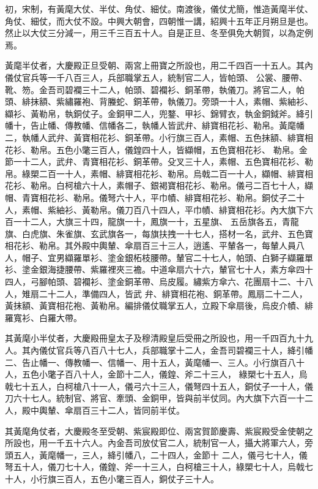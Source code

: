 \begin{pinyinscope}
 初，宋制，有黃麾大仗、半仗、角仗、細仗。南渡後，儀仗尤簡，惟造黃麾半仗、角仗、細仗，而大仗不設。中興大朝會，四朝惟一講，紹興十五年正月朔旦是也。然止以大仗三分減一，用三千三百五十人。自是正旦、冬至俱免大朝賀，以為定例焉。



 黃麾半仗者，大慶殿正旦受朝、兩宮上冊寶之所設也，用二千四百一十五人。其內儀仗官兵等一千八百三人，兵部職掌五人，統制官二人，皆帕頭、
 公裳、腰帶、靴、笏。金吾司碧襴三十二人，帕頭、碧襴衫、銅革帶，執儀刀。將官二人，帕頭、緋抹額、紫繡羅袍、背螣蛇、銅革帶，執儀刀。旁頭一十人，素帽、紫紬衫、纈衫、黃勒帛，執銅仗子。金銅甲二人，兜鍪、甲衫、錦臂衣，執金銅鉞斧。絳引幡十，告止幡、傳教幡、信幡各二，執幡人皆武弁、緋寶相花衫、勒帛。黃麾幡二，執幡人武弁、黃寶相花衫、銅革帶。小行旗三百人，素帽、五色抹額、緋寶相花衫、勒帛。五色小氅三百人，儀鍠四十人，皆纈帽，五色寶相花衫、
 勒帛。金節一十二人，武弁、青寶相花衫、銅革帶。殳叉三十人，素帽、五色寶相花衫、勒帛。綠槊二百一十人，素帽、緋寶相花衫、勒帛。烏戟二百一十人，纈帽、緋寶相花衫、勒帛。白柯槍六十人，素帽子、銀褐寶相花衫、勒帛。儀弓二百七十人，纈帽、青寶相花衫、勒帛。儀弩六十人，平巾幘、緋寶相花衫、勒帛。銅仗子二十人，素帽、紫紬衫、黃勒帛。儀刀百八十四人，平巾幘、緋寶相花衫。內大旗下六百一十二人，大旗三十四，龍旗一十，鳳旗一十，五星旗、
 五岳旗各五，青龍旗、白虎旗、朱雀旗、玄武旗各一，每旗扶拽一十七人，搭材一名，武弁、五色寶相花衫、勒帛。其外殿中輿輦、傘扇百三十三人，逍遙、平輦各一，每輦人員八人，帽子、宜男纈羅單衫、塗金銀柘枝腰帶。輦官二十七人，帕頭、白獅子纈羅單衫、塗金銀海捷腰帶、紫羅裡夾三襜。中道傘扇六十六，輦官七十人，素方傘四十四人，弓腳帕頭、碧襴衫、塗金銅革帶、烏皮履。繡紫方傘六、花團扇十二、十八人，雉扇二十二人，準備四人，皆武
 弁、緋寶相花袍、銅革帶。鳳扇二十二人，黃抹額、黃寶相花袍、黃勒帛。編排儀仗職掌五人，立殿下傘扇後，烏皮介幘、緋羅寬衫、白羅大帶。



 其黃麾小半仗者，大慶殿冊皇太子及穆清殿皇后受冊之所設也，用一千四百九十九人。其內儀仗官兵等八百八十七人，兵部職掌十二人，金吾司碧襴三十人，絳引幡二、告止幡一、傳教幡一、信幡一、用十五人，黃麾幡一、三人。小行旗百八十人，五色小氅子百八十人，金節十二人，儀鍠、斧二十三人，
 綠槊七十五人，烏戟七十五人，白柯槍八十一人，儀弓六十三人，儀弩四十五人，銅仗子一十人，儀刀六十七人。統制官、將官、牽頭、金銅甲，皆與前半仗同。內大旗下六百一十二人，殿中輿輦、傘扇百三十二人，皆同前半仗。



 其黃麾角仗者，大慶殿冬至受朝、紫宸殿即位、兩宮賀節慶壽、紫宸殿受金使朝之所設也，用一千五十六人。內金吾司放仗官二人，統制官一人，攝大將軍六人，旁頭五人，黃麾幡一，三人，絳引幡八，二十四人，金節十
 二人，儀弓七十人，儀弩五十人，儀刀七十人，儀鍠、斧一十三人，白柯槍三十人，綠槊七十人，烏戟七十人，小行旗三百人，五色小氅三百人，銅仗子三十人。




\end{pinyinscope}
